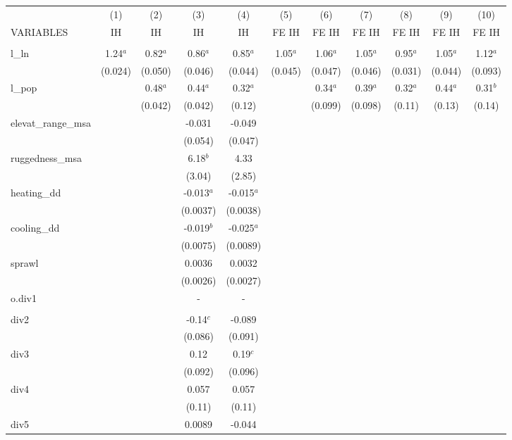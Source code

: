 \documentclass[]{article}
\begin{document}
\begin{tabular}{lcccccccccc} \hline
 & (1) & (2) & (3) & (4) & (5) & (6) & (7) & (8) & (9) & (10) \\
VARIABLES & IH & IH & IH & IH & FE IH & FE IH & FE IH & FE IH & FE IH & FE IH \\ \hline
 &  &  &  &  &  &  &  &  &  &  \\
l\_ln & 1.24$^a$ & 0.82$^a$ & 0.86$^a$ & 0.85$^a$ & 1.05$^a$ & 1.06$^a$ & 1.05$^a$ & 0.95$^a$ & 1.05$^a$ & 1.12$^a$ \\
 & (0.024) & (0.050) & (0.046) & (0.044) & (0.045) & (0.047) & (0.046) & (0.031) & (0.044) & (0.093) \\
l\_pop &  & 0.48$^a$ & 0.44$^a$ & 0.32$^a$ &  & 0.34$^a$ & 0.39$^a$ & 0.32$^a$ & 0.44$^a$ & 0.31$^b$ \\
 &  & (0.042) & (0.042) & (0.12) &  & (0.099) & (0.098) & (0.11) & (0.13) & (0.14) \\
elevat\_range\_msa &  &  & -0.031 & -0.049 &  &  &  &  &  &  \\
 &  &  & (0.054) & (0.047) &  &  &  &  &  &  \\
ruggedness\_msa &  &  & 6.18$^b$ & 4.33 &  &  &  &  &  &  \\
 &  &  & (3.04) & (2.85) &  &  &  &  &  &  \\
heating\_dd &  &  & -0.013$^a$ & -0.015$^a$ &  &  &  &  &  &  \\
 &  &  & (0.0037) & (0.0038) &  &  &  &  &  &  \\
cooling\_dd &  &  & -0.019$^b$ & -0.025$^a$ &  &  &  &  &  &  \\
 &  &  & (0.0075) & (0.0089) &  &  &  &  &  &  \\
sprawl &  &  & 0.0036 & 0.0032 &  &  &  &  &  &  \\
 &  &  & (0.0026) & (0.0027) &  &  &  &  &  &  \\
o.div1 &  &  & - & - &  &  &  &  &  &  \\
 &  &  &  &  &  &  &  &  &  &  \\
div2 &  &  & -0.14$^c$ & -0.089 &  &  &  &  &  &  \\
 &  &  & (0.086) & (0.091) &  &  &  &  &  &  \\
div3 &  &  & 0.12 & 0.19$^c$ &  &  &  &  &  &  \\
 &  &  & (0.092) & (0.096) &  &  &  &  &  &  \\
div4 &  &  & 0.057 & 0.057 &  &  &  &  &  &  \\
 &  &  & (0.11) & (0.11) &  &  &  &  &  &  \\
div5 &  &  & 0.0089 & -0.044 &  &  &  &  &  &  \\

\end{tabular}
\end{document}
